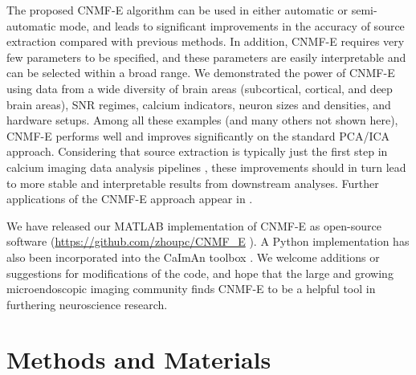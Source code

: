 \documentclass[9pt,lineno]{elife}
\begin{document}
The proposed CNMF-E algorithm can be used in either automatic or semi-automatic mode, and leads to significant improvements in the accuracy of source extraction compared with previous methods. In addition, CNMF-E requires very few parameters to be specified, and these parameters are easily interpretable and can be selected within a broad range. We demonstrated the power of CNMF-E using  data from a wide diversity of brain areas (subcortical, cortical, and deep brain areas), SNR regimes, calcium indicators, neuron sizes and densities, and hardware setups. Among all these examples (and many others not shown here), CNMF-E performs well and improves significantly on the standard PCA/ICA approach. 
Considering that source extraction is typically just the first step in calcium imaging data analysis pipelines \citep{Mohammed2016}, these improvements should in turn lead to more stable and interpretable results from downstream analyses. Further applications of the CNMF-E approach appear in \citep{Cameron2016,Donahue2017,Jimenez2016,Jimenez2017,Klaus2017, Lin2017, Murugan2016,Murugan2017,Rodriguez-Romaguera2017,Tombaz2016,Ung2017,Yu2017,Mackevicius2017,Madangopal2017,Roberts2017,Ryan2017,Roberts2017,sheintuch2017tracking}. 


We have released our MATLAB implementation of CNMF-E as open-source software (\url{https://github.com/zhoupc/CNMF_E} \citep{Zhou2017code}). A Python implementation has also been incorporated into the CaImAn toolbox \citep{giovannucci2017}. We welcome additions or suggestions for modifications of the code, and hope that the large and growing microendoscopic imaging community finds CNMF-E to be a helpful tool in furthering neuroscience research. 


\section{Methods and Materials}
\end{document}
